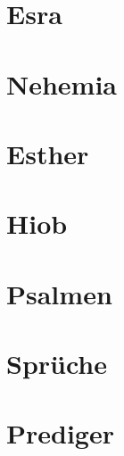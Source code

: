 \chapter{Esra}
\begin{multicols}{2}
  \raggedcolumns
  \parskip=0pt \relax
  
\end{multicols}

\chapter{Nehemia}
\begin{multicols}{2}
  \raggedcolumns
  \parskip=0pt \relax
  
\end{multicols}

\chapter{Esther}
\begin{multicols}{2}
  \raggedcolumns
  \parskip=0pt \relax
  
\end{multicols}

\chapter{Hiob}
\begin{multicols}{2}
  \raggedcolumns
  \parskip=0pt \relax
  
\end{multicols}

\chapter{Psalmen}
\begin{multicols}{2}
  \raggedcolumns
  \parskip=0pt \relax
  
\end{multicols}

\chapter{Sprüche}
\begin{multicols}{2}
  \raggedcolumns
  \parskip=0pt \relax
  
\end{multicols}

\chapter{Prediger}
\begin{multicols}{2}
  \raggedcolumns
  \parskip=0pt \relax
  
\end{multicols}

